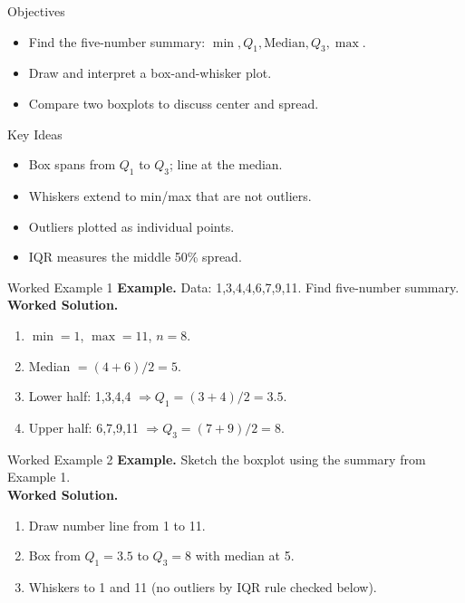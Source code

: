 \documentclass[aspectratio=169]{beamer}
\newcommand{\exampletitle}[1]{\vspace{0.25em}\textbf{Example.} #1\vspace{0.25em}}
\newcommand{\worked}{\textbf{Worked Solution.}}
\begin{document}
\begin{frame}{Objectives}
\begin{itemize}
  \item Find the five-number summary: $\min, Q_1, \text{Median}, Q_3, \max$.
  \item Draw and interpret a box-and-whisker plot.
  \item Compare two boxplots to discuss center and spread.
\end{itemize}
\end{frame}

\begin{frame}{Key Ideas}
\begin{itemize}
  \item Box spans from $Q_1$ to $Q_3$; line at the median.
  \item Whiskers extend to min/max that are not outliers.
  \item Outliers plotted as individual points.
  \item IQR measures the middle 50\% spread.
\end{itemize}
\end{frame}

\begin{frame}{Worked Example 1}
\exampletitle{Data: 1,3,4,4,6,7,9,11. Find five-number summary.}\\[0.25em]
\worked
\begin{enumerate}
  \item $\min=1$, $\max=11$, $n=8$.
  \item Median $=(4+6)/2=5$.
  \item Lower half: 1,3,4,4 $\Rightarrow Q_1=(3+4)/2=3.5$.
  \item Upper half: 6,7,9,11 $\Rightarrow Q_3=(7+9)/2=8$.
\end{enumerate}
\end{frame}

\begin{frame}{Worked Example 2}
\exampletitle{Sketch the boxplot using the summary from Example 1.}\\[0.25em]
\worked
\begin{enumerate}
  \item Draw number line from 1 to 11.
  \item Box from $Q_1=3.5$ to $Q_3=8$ with median at 5.
  \item Whiskers to 1 and 11 (no outliers by IQR rule checked below).
\end{enumerate}
\end{frame}
\end{document}
